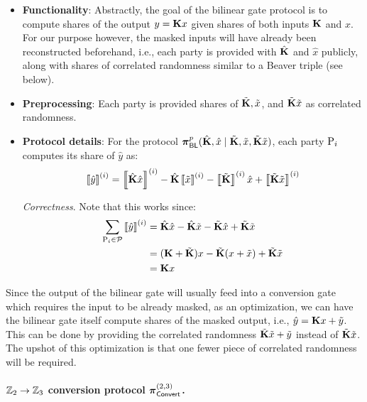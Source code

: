 \begin{itemize}
  \item \textbf{Functionality}: 
  Abstractly, the goal of the bilinear gate protocol is to compute shares of the output $y = \mat{K}x$ given shares of both inputs $\mat{K}$ and $x$. For our purpose however, the masked inputs will have already been reconstructed beforehand, i.e., each party is provided with $\hat{\mat{K}}$ and $\hat{x}$ publicly, along with shares of correlated randomness similar to a Beaver triple (see below).

  \item \textbf{Preprocessing}: Each party is provided shares of $\tilde{\mat{K}}, \tilde{x}$, and $\tilde{\mat{K}}\tilde{x}$ as correlated randomness.

  \item \textbf{Protocol details}: For the protocol $\prot_\BLMap^p(\hat{\mat{K}},\hat{x}\mid \tilde{\mat{K}}, \tilde{x}, \tilde{\mat{K}}\tilde{x})$, each party $\textnormal{P}_i$ computes its share of $\hat{y}$ as:
  \[
    \sharei{\hat{y}} = \sharei{\hat{\mat{K}}\hat{x}} - \hat{\mat{K}}\sharei{\tilde{x}} - \sharei{\tilde{\mat{K}}}\hat{x} + \sharei{\tilde{\mat{K}}\tilde{x}}
  \]

  \noindent \textit{Correctness}. Note that this works since:
  \begin{align*}
  \sum_{\party_i \in \parties} \sharei{\hat{y}} &= \hat{\mat{K}}\hat{x} - \hat{\mat{K}}\tilde{x} - \tilde{\mat{K}}\hat{x} + \tilde{\mat{K}}\tilde{x} \\
  &= (\mat{K} + \tilde{\mat{K}})x - \tilde{\mat{K}}(x + \tilde{x}) + \tilde{\mat{K}}\tilde{x} \\
  &= \mat{K}x
  \end{align*}
\end{itemize}
Since the output of the bilinear gate will usually feed into a conversion gate which requires the input to be already masked, as an optimization, we can have the bilinear gate itself compute shares of the masked output, i.e., $\hat{y} = \mat{K}x + \tilde{y}$. This can be done by providing the correlated randomness $\tilde{\mat{K}}\tilde{x} + \tilde{y}$ instead of $\tilde{\mat{K}}\tilde{x}$. The upshot of this optimization is that one fewer piece of correlated randomness will be required.

\paragraph{$\mathbb{Z}_2 \to \mathbb{Z}_3$ conversion protocol $\boldsymbol{\pi}_{\textsf{Convert}}^{(2,3)}$.}

